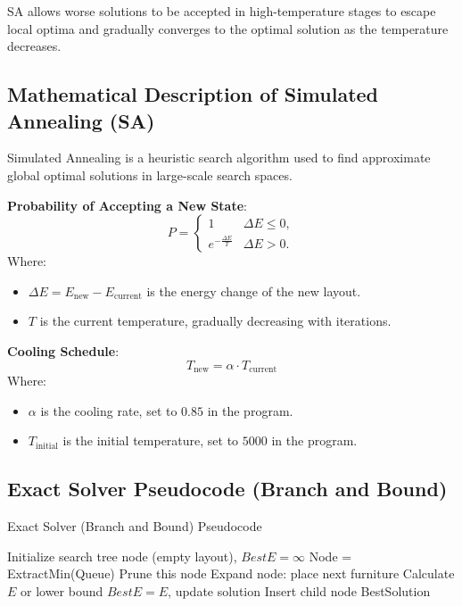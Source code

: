 \documentclass[conference]{IEEEtran}
\begin{document}
SA allows worse solutions to be accepted in high-temperature stages to escape local optima and gradually converges to the optimal solution as the temperature decreases.

\subsection{Mathematical Description of Simulated Annealing (SA)}
Simulated Annealing is a heuristic search algorithm used to find approximate global optimal solutions in large-scale search spaces.

\textbf{Probability of Accepting a New State}:
\[
P = 
\begin{cases} 
1 & \Delta E \leq 0, \\
e^{-\frac{\Delta E}{T}} & \Delta E > 0.
\end{cases}
\]
Where:
\begin{itemize}
    \item \( \Delta E = E_{\text{new}} - E_{\text{current}} \) is the energy change of the new layout.
    \item \( T \) is the current temperature, gradually decreasing with iterations.
\end{itemize}

\textbf{Cooling Schedule}:
\[
T_{\text{new}} = \alpha \cdot T_{\text{current}}
\]
Where:
\begin{itemize}
    \item \( \alpha \) is the cooling rate, set to \( 0.85 \) in the program.
    \item \( T_{\text{initial}} \) is the initial temperature, set to \( 5000 \) in the program.
\end{itemize}

\subsection{Exact Solver Pseudocode (Branch and Bound)}
\begin{algorithm}[!htbp]
\caption{Exact Solver (Branch and Bound) Pseudocode}
\begin{algorithmic}[1]
\STATE Initialize search tree node (empty layout), \( BestE = \infty \)
    \STATE Node = ExtractMin(Queue)
        \STATE Prune this node
    \ELSE
        \STATE Expand node: place next furniture
            \STATE Calculate \( E \) or lower bound
                    \STATE \( BestE = E \), update solution
                \ENDIF
            \ELSE
                \STATE Insert child node
            \ENDIF
        \ENDFOR
    \ENDIF
\ENDWHILE
\RETURN BestSolution
\end{algorithmic}
\end{algorithm}
\end{document}
